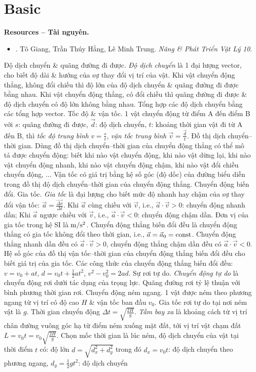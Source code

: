 \documentclass{article}
\begin{document}
\section{Basic}
\textbf{\textsf{Resources -- Tài nguyên.}}
\begin{itemize}
	\item \cite{Giang_Hang_Trung_ncpt_Vat_Ly_10}. {\sc Tô Giang, Trần Thúy Hằng, Lê Minh Trung}. {\it Nâng \& Phát Triển Vật Lý 10}.
\end{itemize}
 {\sf Độ dịch chuyển \& quãng đường đi được.} {\it Độ dịch chuyển} là 1 đại lượng vector, cho biết độ dài \& hướng của sự thay đổi vị trí của vật. Khi vật chuyển động thẳng, không đổi chiều thì độ lớn của độ dịch chuyển \& quãng đường đi được bằng nhau. Khi vật chuyển động thẳng, có đổi chiều thì quãng đường đi được \& độ dịch chuyển có độ lớn không bằng nhau. Tổng hợp các độ dịch chuyển bằng các tổng hợp vector.  {\sf Tốc độ \& vận tốc.} 1 vật chuyển động từ điểm A đến điểm B với $s$: quãng đường đi được, $\vec{d}$: độ dịch chuyển, $t$: khoảng thời gian vật đi từ A đến B, thì {\it tốc độ trung bình} $v = \frac{s}{t}$, {\it vận tốc trung bình} $\vec{v} = \frac{\vec{d}}{t}$.  {\sf Đồ thị dịch chuyển--thời gian.} Dùng đồ thị dịch chuyển--thời gian của chuyển động thẳng có thể mô tả được chuyển động: biết khi nào vật chuyển động, khi nào vật dừng lại, khi nào vật chuyển động nhanh, khi nào vật chuyển động chậm, khi nào vật đổi chiều chuyển động, $\ldots$ Vận tốc có giá trị bằng hệ số góc (độ dốc) của đường biểu diễn trong đồ thị độ dịch chuyển--thời gian của chuyển động thẳng.  {\sf Chuyển động biến đổi. Gia tốc.} {\it Gia tốc} là đại lượng cho biết mức độ nhanh hay chậm của sự thay đổi vận tốc: $\vec{a} = \frac{\overrightarrow{\Delta v}}{\Delta t}$. Khi $\vec{a}$ cùng chiều với $\vec{v}$, i.e., $\vec{a}\cdot\vec{v} > 0$: chuyển động nhanh dần; Khi $\vec{a}$ ngược chiều với $\vec{v}$, i.e., $\vec{a}\cdot\vec{v} < 0$: chuyển động chậm dần. Đơn vị của gia tốc trong hệ SI là $\rm m{\tt/}s^2$.  {\sf Chuyển động thẳng biến đổi đều} là chuyển động thẳng có gia tốc không đổi theo thời gian, i.e., $\vec{a} = \vec{a}_0 = {\rm const}$. Chuyển động thẳng nhanh dần đều có $\vec{a}\cdot\vec{v} > 0$, chuyển động thẳng chậm dần đều có $\vec{a}\cdot\vec{v} < 0$. Hệ số góc của đồ thị vận tốc--thời gian của chuyển động thẳng biến đổi đều cho biết giá trị của gia tốc. Các công thức của chuyển động thẳng biến đổi đều: $v = v_0 + at$, $d = v_0t + \frac{1}{2}at^2$, $v^2 - v_0^2 = 2ad$.  {\sf Sự rơi tự do.} {\it Chuyển động tự do} là chuyển động rơi dưới tác dụng của trọng lực. Quãng đường rơi tỷ lệ thuận với bình phương thời gian rơi.   {\sf Chuyển động ném ngang.} 1 vật được ném theo phương ngang từ vị trí có độ cao $H$ \& vận tốc ban đầu $v_0$. Gia tốc rơi tự do tại nơi ném vật là $g$. Thời gian chuyển động $\Delta t = \sqrt{\frac{2H}{g}}$. {\it Tầm bay xa} là khoảng cách từ vị trí chân đường vuông góc hạ từ điểm ném xuống mặt đất, tới vị trí vật chạm đất $L = v_0t = v_0\sqrt{\frac{2H}{g}}$. Chọn mốc thời gian là lúc ném, độ dịch chuyển của vật tại thời điểm $t$ có: độ lớn $d = \sqrt{d_x^2 + d_y^2}$ trong đó $d_x = v_0t$: độ dịch chuyển theo phương ngang, $d_y = \frac{1}{2}gt^2$: độ dịch chuyển 
\end{document}
